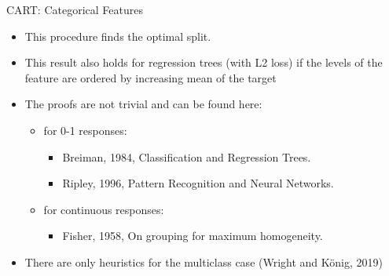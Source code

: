 \documentclass[11pt,compress,t,notes=noshow, xcolor=table]{beamer}
\begin{document}
\begin{vbframe}{CART: Categorical Features}

  \begin{itemize}
  \item This procedure finds the optimal split.
  \item This result also holds for regression trees (with L2 loss) if the levels of the feature are ordered by increasing mean of the target
  \item The proofs are not trivial and can be found here:
    \begin{itemize}
    \item for 0-1 responses:
      \begin{itemize}
      \item Breiman, 1984, Classification and Regression Trees.
      \item Ripley, 1996, Pattern Recognition and Neural Networks.
      \end{itemize}
    \item for continuous responses:
      \begin{itemize}
      \item Fisher, 1958, On grouping for maximum homogeneity.
      \end{itemize}
    \end{itemize}
  \item There are only heuristics for the multiclass case (Wright and König, 2019)
  \end{itemize}

\end{vbframe}
\end{document}
